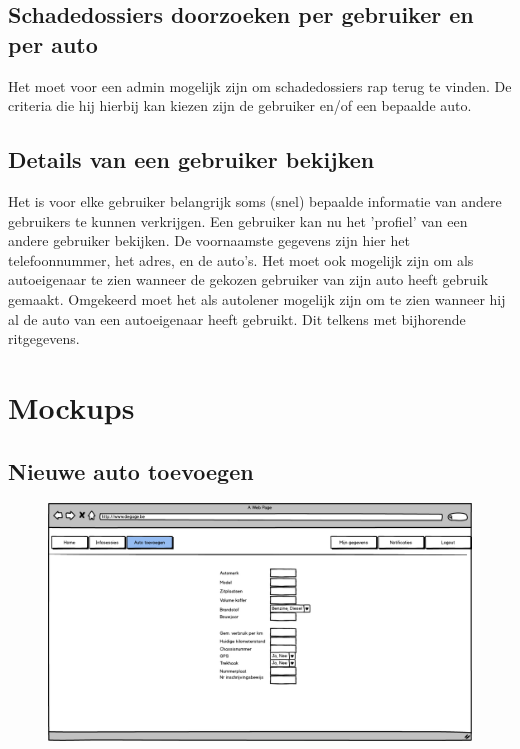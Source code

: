 \documentclass[11pt,a4paper,oneside]{article}
\begin{document}
\subsection{Schadedossiers doorzoeken per gebruiker en per auto}
Het moet voor een admin mogelijk zijn om schadedossiers rap terug te vinden. De criteria die hij hierbij kan kiezen zijn de gebruiker en/of een bepaalde auto.

\subsection{Details van een gebruiker bekijken}
Het is voor elke gebruiker belangrijk soms (snel) bepaalde informatie van andere gebruikers te kunnen verkrijgen. Een gebruiker kan nu het 'profiel' van een andere gebruiker bekijken. De voornaamste gegevens zijn hier het telefoonnummer, het adres, en de auto's. Het moet ook mogelijk zijn om als autoeigenaar te zien wanneer de gekozen gebruiker van zijn auto heeft gebruik gemaakt. Omgekeerd moet het als autolener mogelijk zijn om te zien wanneer hij al de auto van een autoeigenaar heeft gebruikt. Dit telkens met bijhorende ritgegevens.



\section{Mockups}
\subsection{Nieuwe auto toevoegen}
\begin{figure}[H]\includegraphics[width=\textwidth]{../../mockups/registratie_eigenaar_auto.png}\end{figure}
\end{document}
